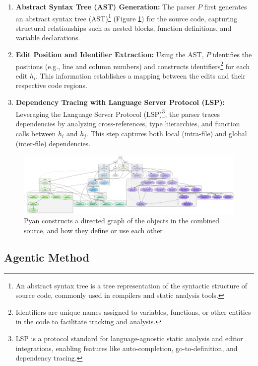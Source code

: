 \begin{enumerate}
    \item \textbf{Abstract Syntax Tree (AST) Generation:}  
    The parser \( P \) first generates an abstract syntax tree (AST)\footnote{An abstract syntax tree is a tree representation of the syntactic structure of source code, commonly used in compilers and static analysis tools.} (Figure \ref{fig:dependency_graph}) for the source code, capturing structural relationships such as nested blocks, function definitions, and variable declarations.

    \item \textbf{Edit Position and Identifier Extraction:}  
    Using the AST, \( P \) identifies the positions (e.g., line and column numbers) and constructs identifiers\footnote{Identifiers are unique names assigned to variables, functions, or other entities in the code to facilitate tracking and analysis.} for each edit \( h_i \). This information establishes a mapping between the edits and their respective code regions.

    \item \textbf{Dependency Tracing with Language Server Protocol (LSP):}  
    Leveraging the Language Server Protocol (LSP)\footnote{LSP is a protocol standard for language-agnostic static analysis and editor integrations, enabling features like auto-completion, go-to-definition, and dependency tracing.}, the parser traces dependencies by analyzing cross-references, type hierarchies, and function calls between \( h_i \) and \( h_j \). This step captures both local (intra-file) and global (inter-file) dependencies.
\end{enumerate}

\begin{figure}
    \centering
    \includegraphics[width=0.8\linewidth]{fig/dependency_graph.png}
    \caption{Pyan constructs a directed graph of the objects in the combined source, and how they define or use each other}
    \label{fig:dependency_graph}
\end{figure}

\subsection{Agentic Method}

